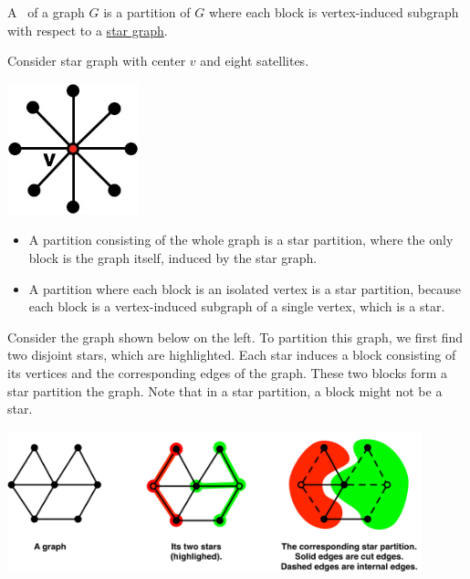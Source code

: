 \begin{flex}

\begin{definition}
\label{def::graphcon::star-partition}
A~ of a graph $G$ is a partition of $G$ where each block
is vertex-induced subgraph with respect to a 
%
\href{def:graphcon::edge::analysis::star::star-graph}{star graph}.
\end{definition}

\begin{example}
\label{ex:graphcon::star::partition::1}
Consider star graph with center $v$ and eight satellites.
  \begin{center}
  \includegraphics[width=1.5in]{./graph-contraction/media-star/star-graph1.jpg}
  \end{center}

\begin{itemize}
\item A partition consisting of the whole graph is a star partition, where 
the only block is the graph itself, induced by the star graph.

\item A partition where each block is an isolated vertex is a star
  partition, because each block is a vertex-induced subgraph of a
  single vertex, which is a star.
\end{itemize}
\end{example}

\begin{example}
\label{ex:graphcon::star::partition::2}


Consider the graph shown below on the left.
%
To partition this graph, we first find two disjoint stars, which are
highlighted.
%
Each star induces a block consisting of its vertices and the
corresponding edges of the graph.
%
These two blocks form a star partition the graph.
%
Note that in a star partition, a block might not be a star.
\begin{center}
\includegraphics[width=0.9\textwidth]{./graph-contraction/media-star/star-decomposition-1.jpg}
\end{center}
\end{example}
\end{flex}

